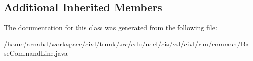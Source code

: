 \subsection*{Additional Inherited Members}


The documentation for this class was generated from the following file\+:\begin{DoxyCompactItemize}
\item 
/home/arnabd/workspace/civl/trunk/src/edu/udel/cis/vsl/civl/run/common/Base\+Command\+Line.\+java\end{DoxyCompactItemize}
